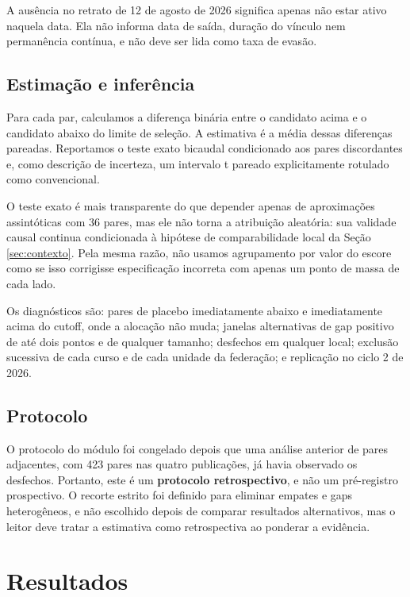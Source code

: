 \documentclass[11pt,a4paper]{article}
\begin{document}
A ausência no retrato de 12 de agosto de 2026 significa apenas não estar ativo
naquela data. Ela não informa data de saída, duração do vínculo nem permanência
contínua, e não deve ser lida como taxa de evasão.

\subsection{Estimação e inferência}

Para cada par, calculamos a diferença binária entre o candidato acima e o
candidato abaixo do limite de seleção. A estimativa é a média dessas diferenças
pareadas. Reportamos o teste exato bicaudal condicionado aos pares discordantes
e, como descrição de incerteza, um intervalo t pareado explicitamente rotulado
como convencional.

O teste exato é mais transparente do que depender apenas de aproximações
assintóticas com 36 pares, mas ele não torna a atribuição aleatória: sua validade
causal continua condicionada à hipótese de comparabilidade local da Seção
\ref{sec:contexto}. Pela mesma razão, não usamos agrupamento por valor do escore
como se isso corrigisse especificação incorreta com apenas um ponto de massa de
cada lado.

Os diagnósticos são: pares de placebo imediatamente abaixo e imediatamente acima
do cutoff, onde a alocação não muda; janelas alternativas de gap positivo de até
dois pontos e de qualquer tamanho; desfechos em qualquer local; exclusão
sucessiva de cada curso e de cada unidade da federação; e replicação no ciclo 2
de 2026.

\subsection{Protocolo}

O protocolo do módulo foi congelado depois que uma análise anterior de pares
adjacentes, com 423 pares nas quatro publicações, já havia observado os
desfechos. Portanto, este é um \textbf{protocolo retrospectivo}, e não um
pré-registro prospectivo. O recorte estrito foi definido para eliminar empates e
gaps heterogêneos, e não escolhido depois de comparar resultados alternativos,
mas o leitor deve tratar a estimativa como retrospectiva ao ponderar a evidência.

\section{Resultados}
\label{sec:resultados}
\end{document}
